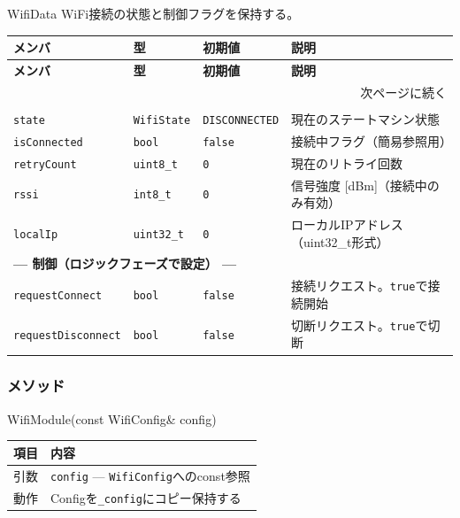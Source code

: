 \begin{funcblock}{WifiData}
WiFi接続の状態と制御フラグを保持する。

\begin{longtable}{l l l p{3.8cm}}
\toprule
\textbf{メンバ} & \textbf{型} & \textbf{初期値} & \textbf{説明} \\
\midrule
\endfirsthead
\toprule
\textbf{メンバ} & \textbf{型} & \textbf{初期値} & \textbf{説明} \\
\midrule
\endhead
\midrule
\multicolumn{4}{r}{\small 次ページに続く} \\
\endfoot
\bottomrule
\endlastfoot
\multicolumn{4}{l}{\textbf{--- 状態（入力フェーズで更新） ---}} \\
\texttt{state}       & \texttt{WifiState} & \texttt{DISCONNECTED} & 現在のステートマシン状態 \\
\texttt{isConnected} & \texttt{bool}      & \texttt{false}        & 接続中フラグ（簡易参照用） \\
\texttt{retryCount}  & \texttt{uint8\_t}  & \texttt{0}            & 現在のリトライ回数 \\
\texttt{rssi}        & \texttt{int8\_t}   & \texttt{0}            & 信号強度 [dBm]（接続中のみ有効） \\
\texttt{localIp}     & \texttt{uint32\_t} & \texttt{0}            & ローカルIPアドレス（uint32\_t形式） \\
\midrule
\multicolumn{4}{l}{\textbf{--- 制御（ロジックフェーズで設定） ---}} \\
\texttt{requestConnect}    & \texttt{bool} & \texttt{false} & 接続リクエスト。\texttt{true}で接続開始 \\
\texttt{requestDisconnect} & \texttt{bool} & \texttt{false} & 切断リクエスト。\texttt{true}で切断 \\
\end{longtable}
\end{funcblock}

\subsubsection{メソッド}

\begin{funcblock}{WifiModule(const WifiConfig\& config)}
\begin{tabularx}{\textwidth}{l X}
\toprule
\textbf{項目} & \textbf{内容} \\
\midrule
引数   & \texttt{config} --- \texttt{WifiConfig}へのconst参照 \\
動作   & Configを\texttt{\_config}にコピー保持する \\
\bottomrule
\end{tabularx}
\end{funcblock}

